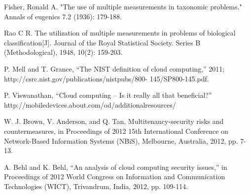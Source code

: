 \documentclass[a4paper]{article}
\begin{document}
\begin{thebibliography}{99}

 Fisher, Ronald A. "The use of multiple measurements in taxonomic problems." Annals of eugenics 7.2 (1936): 179-188.

 Rao C R. The utilization of multiple measurements in problems of biological classification[J]. Journal of the Royal Statistical Society. Series B (Methodological), 1948, 10(2): 159-203.
	
 P. Mell and T. Grance, “The NIST definition of cloud computing,”  2011; http://csrc.nist.gov/publications/nistpubs/800-
	145/SP800-145.pdf.
	
 P. Viswanathan, “Cloud computing – Is it really all that beneficial?” http://mobiledevices.about.com/od/additionalresources/
 
 W. J. Brown, V. Anderson, and Q. Tan, Multitenancy-security
risks and countermeasures, in Proceedings of 2012 15th
International Conference on Network-Based Information
Systems (NBiS), Melbourne, Australia, 2012, pp. 7-13.

 A. Behl and K. Behl, “An analysis of cloud computing security issues,” in Proceedings of 2012 World Congress on Information and Communication Technologies (WICT), Trivandrum, India, 2012, pp. 109-114. 
 


\end{thebibliography}
\end{document}
